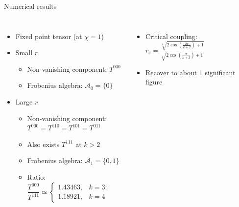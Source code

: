 \documentclass{fdubeamer}
\newcommand{\1}{\mathbb{1}}
\begin{document}
\begin{frame}{Numerical results}

\begin{columns}[T]


    \begin{itemize}
      \item Fixed point tensor (at $\chi=1$)
      \item Small $r$

        \begin{itemize}
          \item Non-vanishing component: $T^{000}$
          \item Frobenius algebra: $\mathcal{A}_0=\{0\}$
        \end{itemize}

      \item Large $r$

        \begin{itemize}
          \item Non-vanishing component: \\
            \mbox{\quad} $T^{000}=T^{110}=T^{101}=T^{011}$
          \item Also exists $T^{111}$ at $k>2$
          \item Frobenius algebra: $\mathcal{A}_1=\{0,1\}$
          \item Ratio:
            $
              \dfrac{T^{000}}{T^{111}} \simeq \begin{cases}
                1.43463, & k = 3; \\[-0.5ex]
                1.18921, & k = 4
              \end{cases}
            $
        \end{itemize}
    \end{itemize}


    \vspace{-0.85em}
    \begin{itemize}
      \item Critical coupling:
        $r_{\!\mathrm{c}} = \frac{\sqrt[4]{2\cos\left(\frac{2\pi}{k+2}\right) + 1}}{\sqrt{2\cos\left(\frac{\pi}{k+2}\right) + 1}}$
      \item Recover to about 1 significant figure
    \end{itemize}


\end{columns}
\end{frame}
\end{document}
